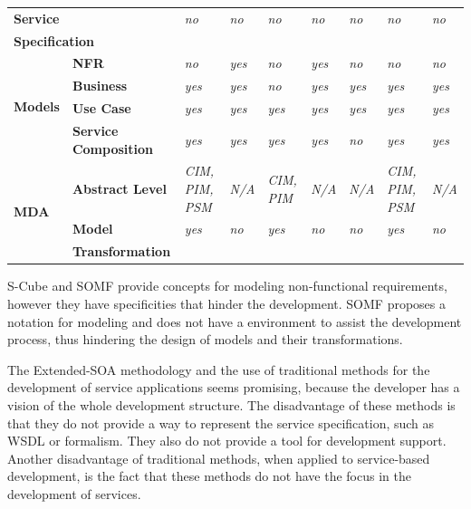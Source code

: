 \begin{table}
\begin{tabular}{l|l|l|l|l|l|l|l|l}
\multicolumn{2}{l|}{ \textbf{Service}} & \textit{no}  & \textit{no}
 &\textit{no} & \textit{no} &  \textit{no} &  \textit{no} & 
 \textit{no} \\
\multicolumn{2}{l|}{\textbf{Specification}} &  & & &  &   &   & \\ \hline
\multirow{4}{*}{\begin{sideways}\textbf{Models}\end{sideways}} &
\textbf{NFR } & \textit{no} & \textit{yes} &\textit{no}  &\textit{yes}
&\textit{no} & \textit{no} & \textit{no} \\ \cline{2-9}
& \textbf{Business } &\textit{yes} &\textit{yes} & \textit{no}&
\textit{yes}&\textit{yes} &\textit{yes} &\textit{yes}\\\cline{2-9}
 & \textbf{Use Case } &\textit{yes} &\textit{yes} & \textit{yes}& \textit{yes}&
\textit{yes} & \textit{yes}& \textit{yes}\\ \cline{2-9}
& \textbf{Service Composition } & \textit{yes}& \textit{yes}& \textit{yes}&
\textit{yes}& \textit{no}&\textit{yes} &\textit{yes}\\\hline
\multirow{3}{*}{\begin{sideways}\textbf{MDA}\end{sideways}} &
\textbf{Abstract Level} & \textit{CIM, PIM, PSM} &\textit{N/A} &\textit{CIM, PIM} & \textit{N/A}
&\textit{N/A} &\textit{CIM, PIM, PSM} &\textit{N/A} \\ \cline{2-9}

& \textbf{Model}&\textit{yes} & \textit{no}
&\textit{ yes} & \textit{no} & \textit{no} & \textit{yes} & \textit{no}\\

& \textbf{Transformation}& & 
& &  &  & & \\
\hline
\hline
\end{tabular}
\end{table}  

S-Cube and SOMF provide concepts for modeling 
non-functional requirements, however they have specificities that hinder the
development. SOMF proposes a notation for modeling and does not have a
environment to assist the development process, thus hindering the design of
models and their transformations. 


The Extended-SOA methodology and the use of traditional methods for the
development of service applications seems promising, because
the developer has a vision of the whole development structure. The
disadvantage of these methods is that they do not provide a way to represent the service specification, such as WSDL
or formalism. They also do not provide a
tool for development support. Another disadvantage of traditional methods, when
applied to service-based development, is the fact that these methods do not have
the focus in the development of services.

